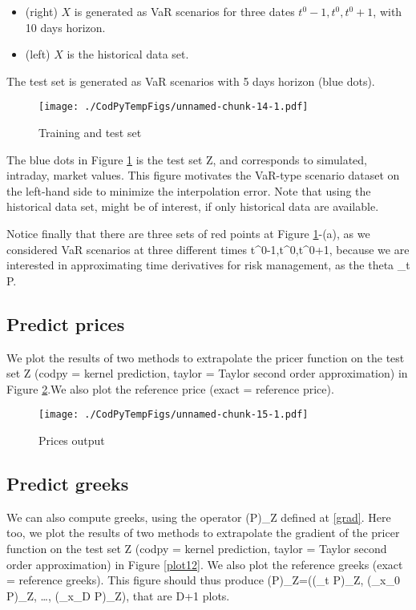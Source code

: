 \documentclass[]{article}
\def\({}%
\def\){}%
\numberwithin{equation}{section}
\begin{document}
\begin{itemize}
\item (right) $X$ is generated as VaR scenarios for three dates $t^0-1,t^0,t^0+1$, with 10 days horizon.
\item (left) $X$ is the historical data set.
\end{itemize}

The test set is generated as VaR scenarios with 5 days horizon (blue
dots).

\begin{figure}
\centering
\texttt{[image: ./CodPyTempFigs/unnamed-chunk-14-1.pdf]}
\caption{\label{plot10} Training and test set}
\end{figure}

The blue dots in Figure \ref{plot10} is the test set \(Z\), and
corresponds to simulated, intraday, market values. This figure motivates
the VaR-type scenario dataset on the left-hand side to minimize the
interpolation error. Note that using the historical data set, might be
of interest, if only historical data are available.

Notice finally that there are three sets of red points at Figure
\ref{plot10}-(a), as we considered VaR scenarios at three different
times \(t^0-1,t^0,t^0+1\), because we are interested in approximating
time derivatives for risk management, as the theta \(\partial_t P\).

\newpage

\subsection{Predict prices}\label{predict-prices}

We plot the results of two methods to extrapolate the pricer function on
the test set \(Z\) (codpy = kernel prediction, taylor = Taylor second
order approximation) in Figure \ref{plot11}.We also plot the reference
price (exact = reference price).

\begin{figure}
\centering
\texttt{[image: ./CodPyTempFigs/unnamed-chunk-15-1.pdf]}
\caption{\label{plot11} Prices output}
\end{figure}

\newpage

\subsection{Predict greeks}\label{predict-greeks}

We can also compute greeks, using the operator \((\nabla P)_Z\) defined
at \eqref{grad}. Here too, we plot the results of two methods to
extrapolate the gradient of the pricer function on the test set \(Z\)
(codpy = kernel prediction, taylor = Taylor second order approximation)
in Figure \ref{plot12}. We also plot the reference greeks (exact =
reference greeks). This figure should thus produce
\((\nabla P)_Z=\big((\partial_t P)_Z, (\partial_{x_0} P)_Z, \ldots, (\partial_{x_D} P)_Z\big)\),
that are \(D+1\) plots.
\end{document}
